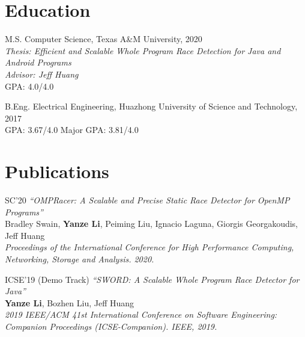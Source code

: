 \documentclass[12pt,letterpaper]{report}
\begin{document}
	
	\section*{Education}
	
	\begin{tablist}
		
		
		\item[M.S.]  \tab Computer Science, Texas A\&M University, 2020 \\
		\textit{Thesis: Efficient and Scalable Whole Program Race Detection for Java and Android Programs}\\
		\textit{Advisor: Jeff Huang}\\
		GPA: 4.0/4.0
		
		\item[B.Eng.]  \tab Electrical Engineering, Huazhong University of Science and Technology, 2017 \\
		GPA: 3.67/4.0 \hspace{0.5cm} Major GPA: 3.81/4.0
				
	\end{tablist}


	


	\section*{Publications}
	\begin{tablist}
		 \item[SC'20] \tab \textit{\enquote{OMPRacer: A Scalable and Precise Static Race Detector for OpenMP Programs}}\\
		 		           Bradley Swain, \textbf{Yanze Li}, Peiming Liu, Ignacio Laguna, Giorgis Georgakoudis, Jeff Huang\\
		 		           \textit{Proceedings of the International Conference for High Performance Computing, Networking, Storage and Analysis. 2020.}
		\item[ICSE'19] \tab (Demo Track) \textit{\enquote{SWORD: A Scalable Whole Program Race Detector for Java}} \\
							 \textbf{Yanze Li}, Bozhen Liu, Jeff Huang\\
							 \textit{2019 IEEE/ACM 41st International Conference on Software Engineering: Companion Proceedings (ICSE-Companion). IEEE, 2019.}
	\end{tablist}
\end{document}
